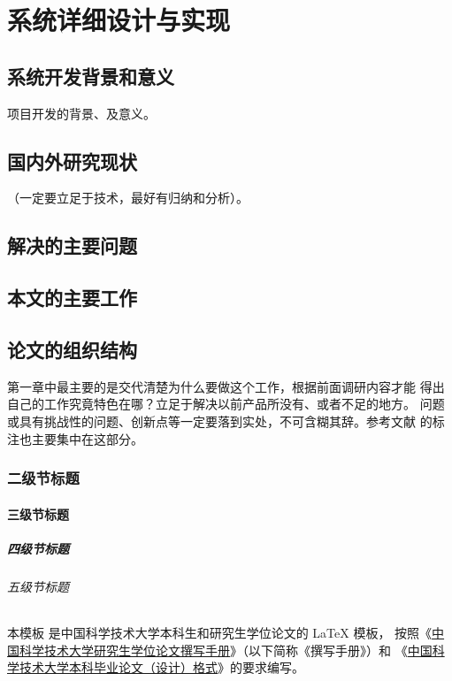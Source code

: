 
\chapter{系统详细设计与实现}

\section{系统开发背景和意义}
项目开发的背景、及意义。
\section{国内外研究现状}
（一定要立足于技术，最好有归纳和分析）。
\section{解决的主要问题}

\section{本文的主要工作}

\section{论文的组织结构}
第一章中最主要的是交代清楚为什么要做这个工作，根据前面调研内容才能
得出自己的工作究竟特色在哪？立足于解决以前产品所没有、或者不足的地方。
问题或具有挑战性的问题、创新点等一定要落到实处，不可含糊其辞。参考文献
的标注也主要集中在这部分。


\subsection{二级节标题}

\subsubsection{三级节标题}

\paragraph{四级节标题}

\subparagraph{五级节标题}

本模板  是中国科学技术大学本科生和研究生学位论文的 \LaTeX{}
模板， 按照《\href{https://gradschool.ustc.edu.cn/static/upload/article/picture/ce3b02e5f0274c90b9331ef50ae1ac26.pdf}
{中国科学技术大学研究生学位论文撰写手册}》（以下简称《撰写手册》）和
《\href{https://www.teach.ustc.edu.cn/?attachment_id=13867}
{中国科学技术大学本科毕业论文（设计）格式}》的要求编写。

